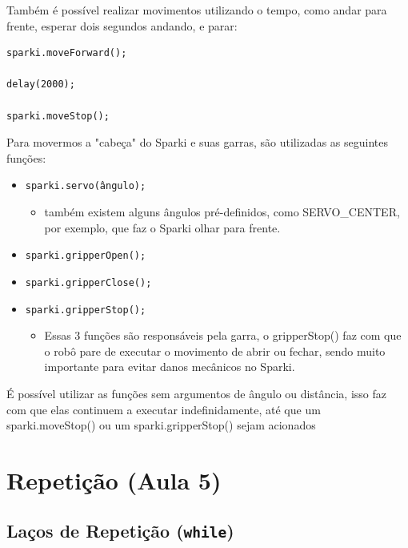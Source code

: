 \documentclass[conference]{IEEEtran}
\begin{document}
\vspace{0.2cm}

Também é possível realizar movimentos utilizando o tempo, como andar para frente, esperar dois segundos andando, e parar:
\begin{lstlisting}[caption={Movimento usando delay}]
sparki.moveForward();

delay(2000);

sparki.moveStop();
\end{lstlisting}
\vspace{0.2cm}
Para movermos a "cabeça" do Sparki e suas garras, são utilizadas as seguintes funções:
\begin{itemize}
    \item \texttt{sparki.servo(ângulo);}
    \begin{itemize}
        \item também existem alguns ângulos pré-definidos, como SERVO\_CENTER, por exemplo, que faz o Sparki olhar para frente.
    \end{itemize}
    \item \texttt{sparki.gripperOpen();}
    \item \texttt{sparki.gripperClose();}
    \item \texttt{sparki.gripperStop();}   
    \begin{itemize}
        \item Essas 3 funções são responsáveis pela garra, o gripperStop() faz com que o robô pare de executar o movimento de abrir ou fechar, sendo muito importante para evitar danos mecânicos no Sparki.
    \end{itemize}
\end{itemize}
\vspace{0.2cm}
É possível utilizar as funções sem argumentos de ângulo ou distância, isso faz com que elas continuem a executar indefinidamente, até que um sparki.moveStop() ou um sparki.gripperStop() sejam acionados

\vspace{0.5cm}
\section{Repetição (Aula 5)}

\subsection{Laços de Repetição (\texttt{while})}
\end{document}
